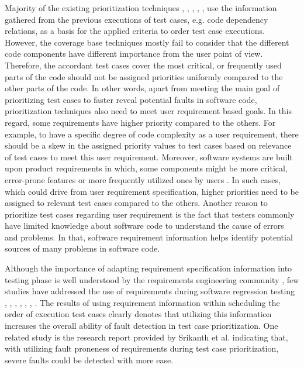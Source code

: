 \documentclass{sig-alternate}
\begin{document}
Majority of the existing prioritization techniques \cite{junaid:clustering}, \cite{elbaum:family}, \cite{jeffrey:slices}, \cite{kim:history}, \cite{mirarab:bayesian}, \cite{rothermel:prioritizing} use the information gathered from the previous executions of test cases, e.g. code dependency relations, as a basis for the applied criteria to order test case executions. However, the coverage base techniques mostly fail to consider that the different code components have different importance from the user point of view. Therefore, the accordant test cases cover the most critical, or frequently used parts of the code should not be assigned priorities uniformly compared to the other parts of the code. In other words, apart from meeting the main goal of prioritizing test cases to faster reveal potential faults in software code,  prioritization techniques also need to meet user requirement based goals. In this regard, some requirements have higher priority compared to the others. For example, to have a specific degree of code complexity as a user requirement, there should be a skew in the assigned priority values to test cases based on relevance of test cases to meet this user requirement. Moreover, software systems are built upon product requirements in which, some components might be more critical, error-prone features or more frequently utilized ones by users \cite{junaid:clustering}. In such cases, which could drive from user requirement specification, higher priorities need to be assigned to relevant test cases compared to the others. Another reason to prioritize test cases regarding user requirement is the fact that testers\textsc{} commonly have limited knowledge about software code to understand the cause of errors and problems. In that, software requirement information helps identify potential sources of many problems in software code. 

Although the importance of adapting requirement specification information into testing phase is well understood by the requirements engineering community \cite{bach:risk}, few studies have addressed the use of requirements during software regression testing \cite{junaid:clustering}, \cite{ozturk:quality}, \cite{saleh:goaldriven}, \cite{Kavitha:requirement}, \cite{krish:varying}, \cite{mahfuzul:multiobjective}, \cite{marchetto:multi}. The results of using requirement information within scheduling the order of execution test cases clearly denotes that utilizing this information increases the overall ability of fault detection in test case prioritization. One related study is the research report provided by Srikanth et al. \cite{srikanth:system} indicating that, with utilizing fault proneness of requirements during test case prioritization, severe faults could be detected with more ease. 
\end{document}
